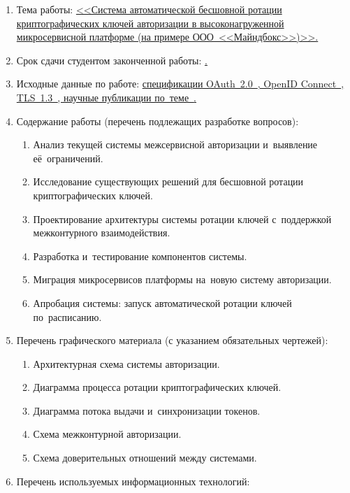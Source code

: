 \begin{enumerate}[1.]
	\item Тема работы: \uline{<<Система автоматической бесшовной ротации криптографических ключей авторизации в высоконагруженной микросервисной платформе (на примере ООО~<<Майндбокс>>)>>.}
	\item Срок сдачи студентом законченной работы: \uline{\thesisDeadline.}
	\item Исходные данные по работе: \uline{спецификации OAuth~2.0~\cite{RFC6749}, OpenID Connect~\cite{OpenIDConnect}, TLS~1.3~\cite{RFC8446}, научные публикации по~теме~\cite{Matias2023, Arora2024}.}
	\printbibliographyTask{} %
	\item Содержание работы (перечень подлежащих разработке вопросов):
	\begin{enumerate}[label=\theenumi\arabic*.]
		\item Анализ текущей системы межсервисной авторизации и~выявление её~ограничений.
		\item Исследование существующих решений для бесшовной ротации криптографических ключей.
		\item Проектирование архитектуры системы ротации ключей с~поддержкой межконтурного взаимодействия.
		\item Разработка и~тестирование компонентов системы.
		\item Миграция микросервисов платформы на~новую систему авторизации.
		\item Апробация системы: запуск автоматической ротации ключей по~расписанию.
	\end{enumerate}
	\item Перечень графического материала (с указанием обязательных чертежей):
	\begin{enumerate}[label=\theenumi\arabic*.]
		\item Архитектурная схема системы авторизации.
		\item Диаграмма процесса ротации криптографических ключей.
		\item Диаграмма потока выдачи и~синхронизации токенов.
		\item Схема межконтурной авторизации.
		\item Схема доверительных отношений между системами.
	\end{enumerate}
		\item Перечень используемых информационных технологий:

\end{enumerate}
